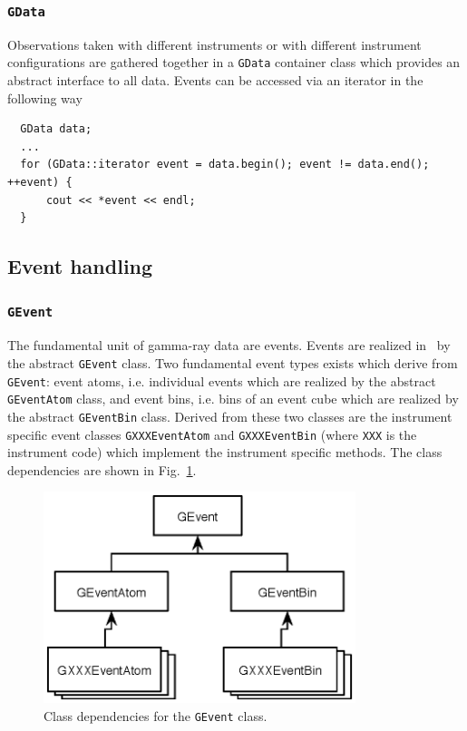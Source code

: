 \documentclass{article}[12pt,a4]
\begin{document}
\subsubsection{{\tt GData}}

Observations taken with different instruments or with different instrument configurations are
gathered together in a {\tt GData} container class which provides an abstract interface to all 
data.
Events can be accessed via an iterator in the following way
\begin{verbatim}
  GData data;
  ...
  for (GData::iterator event = data.begin(); event != data.end(); ++event) {
      cout << *event << endl;
  }
\end{verbatim}



\subsection{Event handling}

\subsubsection{{\tt GEvent}}

The fundamental unit of gamma-ray data are events.
Events are realized in \this\ by the abstract {\tt GEvent} class.
Two fundamental event types exists which derive from {\tt GEvent}:
event atoms, i.e. individual events which are realized by the abstract {\tt GEventAtom} class, and
event bins, i.e. bins of an event cube which are realized by the abstract {\tt GEventBin} class.
Derived from these two classes are the instrument specific event classes
{\tt GXXXEventAtom} and {\tt GXXXEventBin} (where {\tt XXX} is the instrument code)
which implement the instrument specific methods.
The class dependencies are shown in Fig.~\ref{fig:GEvent}.
%
%
\begin{figure}[!h]
\centering
\includegraphics[width=9.1cm]{GEvent.eps}
\caption{Class dependencies for the {\tt GEvent} class.}
\label{fig:GEvent}
\end{figure}
%
\end{document}
